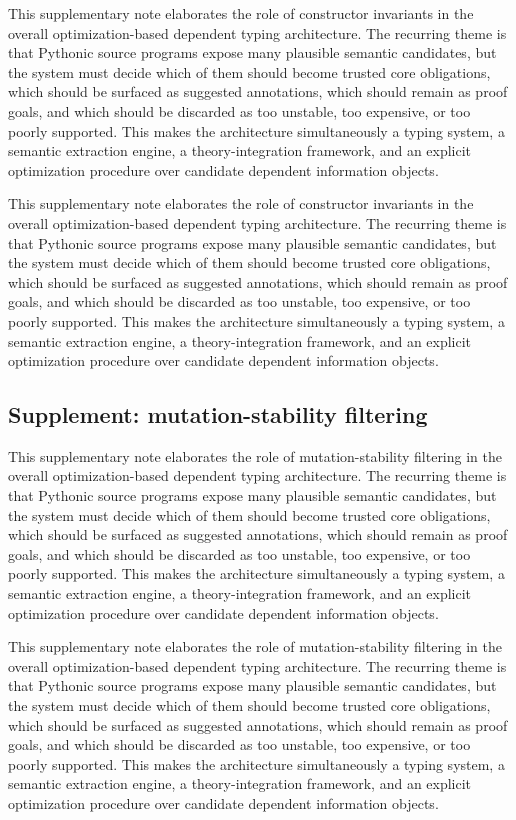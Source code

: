 \documentclass[11pt]{article}
\theoremstyle{definition}
\theoremstyle{plain}
\begin{document}
This supplementary note elaborates the role of constructor invariants in the overall
optimization-based dependent typing architecture. The recurring theme is that
Pythonic source programs expose many plausible semantic candidates, but the
system must decide which of them should become trusted core obligations, which
should be surfaced as suggested annotations, which should remain as proof
goals, and which should be discarded as too unstable, too expensive, or too
poorly supported. This makes the architecture simultaneously a typing system,
a semantic extraction engine, a theory-integration framework, and an explicit
optimization procedure over candidate dependent information objects.

This supplementary note elaborates the role of constructor invariants in the overall
optimization-based dependent typing architecture. The recurring theme is that
Pythonic source programs expose many plausible semantic candidates, but the
system must decide which of them should become trusted core obligations, which
should be surfaced as suggested annotations, which should remain as proof
goals, and which should be discarded as too unstable, too expensive, or too
poorly supported. This makes the architecture simultaneously a typing system,
a semantic extraction engine, a theory-integration framework, and an explicit
optimization procedure over candidate dependent information objects.

\subsection{Supplement: mutation-stability filtering}
This supplementary note elaborates the role of mutation-stability filtering in the overall
optimization-based dependent typing architecture. The recurring theme is that
Pythonic source programs expose many plausible semantic candidates, but the
system must decide which of them should become trusted core obligations, which
should be surfaced as suggested annotations, which should remain as proof
goals, and which should be discarded as too unstable, too expensive, or too
poorly supported. This makes the architecture simultaneously a typing system,
a semantic extraction engine, a theory-integration framework, and an explicit
optimization procedure over candidate dependent information objects.

This supplementary note elaborates the role of mutation-stability filtering in the overall
optimization-based dependent typing architecture. The recurring theme is that
Pythonic source programs expose many plausible semantic candidates, but the
system must decide which of them should become trusted core obligations, which
should be surfaced as suggested annotations, which should remain as proof
goals, and which should be discarded as too unstable, too expensive, or too
poorly supported. This makes the architecture simultaneously a typing system,
a semantic extraction engine, a theory-integration framework, and an explicit
optimization procedure over candidate dependent information objects.
\end{document}
